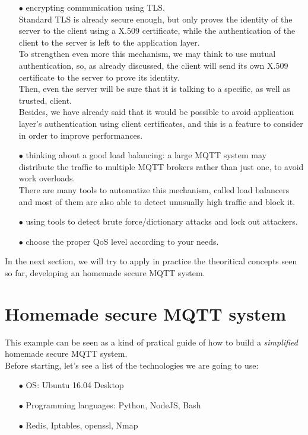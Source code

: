 \documentclass[12pt]{report}
\begin{document}
{{\begin{itemize}
\item[$\bullet$] encrypting communication using TLS.\\
Standard TLS is already secure enough, but only proves the identity of the server to the client using a X.509 certificate, while the authentication of the client to the server is left to the application layer.\\
To strengthen even more this mechanism, we may think to use mutual authentication, so, as already discussed, the client will send its own X.509 certificate to the server to prove its identity.\\
Then, even the server will be sure that it is talking to a specific, as well as trusted, client.\\
Besides, we have already said that it would be possible to avoid application layer's authentication using client certificates, and this is a feature to consider in order to improve performances.

\item[$\bullet$] thinking about a good load balancing: a large MQTT system may distribute the traffic to multiple MQTT brokers rather than just one, to avoid work overloads.\\
There are many tools to automatize this mechanism, called load balancers and most of them are also able to detect unusually high traffic and block it.
\item[$\bullet$] using tools to detect brute force/dictionary attacks and lock out attackers.
\item[$\bullet$] choose the proper QoS level according to your needs.\\
\end{itemize}

In the next section, we will try to apply in practice the theoritical concepts seen so far, developing an homemade secure MQTT system.\\

\section{Homemade secure MQTT system}
\bigskip
This example can be seen as a kind of pratical guide of how to build a \emph{simplified} homemade secure MQTT system.\\
Before starting, let's see a list of the technologies we are going to use:
\bigskip
\begin{itemize}
\setlength{\itemindent}{+4mm}
\item[$\bullet$] OS: Ubuntu 16.04 Desktop
\item[$\bullet$] Programming languages: Python, NodeJS, Bash
\item[$\bullet$] Redis, Iptables, openssl, Nmap\\
\end{itemize}

}}
\end{document}
